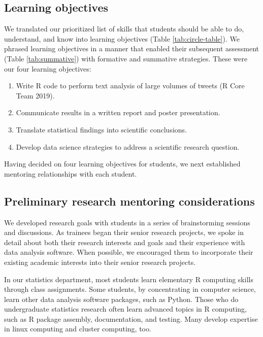 \documentclass[
]{article}
\providecommand{\tightlist}{%
  \setlength{\itemsep}{0pt}\setlength{\parskip}{0pt}}
\begin{document}
\hypertarget{learning-objectives}{%
\subsection{Learning objectives}\label{learning-objectives}}

We translated our prioritized list of skills that
students should be able to do, understand, and know into learning objectives (Table \ref{tab:circle-table}).
We phrased learning objectives in a manner that enabled their subsequent assessment
(Table \ref{tab:summative}) with formative and summative strategies. These were
our four learning objectives:

\begin{enumerate}
\def\labelenumi{\arabic{enumi}.}
\tightlist
\item
  Write R code to perform text analysis of large volumes of tweets (R Core Team 2019).
\item
  Communicate results in a written report and poster presentation.
\item
  Translate statistical findings into scientific conclusions.
\item
  Develop data science strategies to address a scientific research question.
\end{enumerate}

Having decided on four learning objectives for students, we next established
mentoring relationships with each student.

\hypertarget{preliminary-research-mentoring-considerations}{%
\subsection{Preliminary research mentoring considerations}\label{preliminary-research-mentoring-considerations}}

We developed research goals with students in a series of brainstorming sessions and discussions.
As trainees began their senior
research projects, we spoke in detail about both their research interests and goals and their
experience with data analysis software. When possible, we encouraged them to incorporate their
existing academic interests into their senior research projects.

In our statistics department, most students learn elementary R computing skills through class
assignments. Some students, by concentrating in computer science, learn other data analysis software
packages, such as Python.
Those who do undergraduate statistics research often learn advanced topics in R
computing, such as R package assembly, documentation, and testing. Many develop
expertise in linux computing and cluster computing, too.
\end{document}
